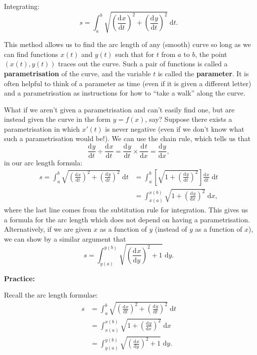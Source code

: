 \documentclass{article}
\newcommand{\deriv}[3][]{\frac{\mathrm{d}^{#1}#2}{\mathrm{d}#3^{#1}}}
\newcommand{\diff}{\;\mathrm{d}}
\begin{document}
Integrating:
\[s=\int_a^b\sqrt{\left(\deriv{x}{t}\right)^2+\left(\deriv{y}{t}\right)^2}\diff t.\]
\bigskip

This method allows us to find the arc length of any (smooth) curve so long as we can find functions $x(t)$ and $y(t)$ such that for $t$ from $a$ to $b$, the point $(x(t),y(t))$ traces out the curve. Such a pair of functions is called a \textbf{parametrisation} of the curve, and the variable $t$ is called the \textbf{parameter}. It is often helpful to think of a parameter as time (even if it is given a different letter) and a parametrisation as instructions for how to ``take a walk'' along the curve.

What if we aren't given a parametrisation and can't easily find one, but are instead given the curve in the form $y=f(x)$, say? Suppose there exists a parametrisation in which $x'(t)$ is never negative (even if we don't know what such a parametrisation would be!). We can use the chain rule, which tells us that
\[\deriv{y}{t}\div\deriv{x}{t}=\deriv{y}{t}\times\deriv{t}{x}=\deriv{y}{x},\]
in our arc length formula:
\begin{align*}
	s=\int_a^b \sqrt{\left(\deriv{x}{t}\right)^2+\left(\deriv{y}{t}\right)^2}\diff t &= \int_a^b\left[\sqrt{1+\left(\deriv{y}{t}\right)^2}\right]\deriv{x}{t}\diff t\\
	&=\int_{x(a)}^{x(b)} \sqrt{1+\left(\deriv{y}{x}\right)^2}\diff x,
\end{align*}
where the last line comes from the subtitution rule for integration. This gives us a formula for the arc length which does not depend on having a parametrisation. Alternatively, if we are given $x$ as a function of $y$ (instead of $y$ as a function of $x$), we can show by a similar argument that
\[s=\int_{y(a)}^{y(b)} \sqrt{\left(\deriv{x}{y}\right)^2+1}\diff y.\]



\clearpage


















\textbf{Practice:}\bigskip


Recall the arc length formulae:
\begin{align*}
	s&=\int_a^b \sqrt{\left(\deriv{x}{t}\right)^2+\left(\deriv{y}{t}\right)^2}\diff t\\
	&=\int_{x(a)}^{x(b)}\sqrt{1+\left(\deriv{y}{x}\right)^2}\diff x\\
	&=\int_{y(a)}^{y(b)}\sqrt{\left(\deriv{x}{y}\right)^2+1}\diff y.
\end{align*}
\end{document}
